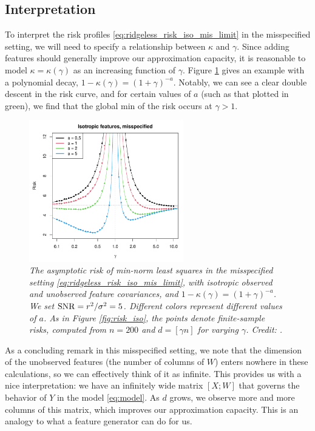 \documentclass{article}
\begin{document}
\subsection{Interpretation}

To interpret the risk profiles \eqref{eq:ridgeless_risk_iso_mis_limit} in the 
misspecified setting, we will need to specify a relationship between $\kappa$
and $\gamma$. Since adding features should generally improve our approximation
capacity, it is reasonable to model $\kappa=\kappa(\gamma)$ as an increasing 
function of $\gamma$. Figure \ref{fig:risk_iso_mis} gives an example with a
polynomial decay, $1-\kappa(\gamma) = (1+\gamma)^{-a}$. Notably, we can see a
clear double descent in the risk curve, and for certain values of $a$ (such as
that plotted in green), we find that the global min of the risk occurs at
$\gamma > 1$.  

\begin{figure}[htb]
\centering
\includegraphics[width=0.6\textwidth]{risk_iso_mis.pdf}
\caption{\it The asymptotic risk of min-norm least squares in the misspecified
  setting \eqref{eq:ridgeless_risk_iso_mis_limit}, with isotropic observed and 
  unobserved feature covariances, and $1-\kappa(\gamma) = (1+\gamma)^{-a}$. We
  set $\mathrm{SNR} = r^2 / \sigma^2 = 5$. Different colors represent different values
  of $a$. As in Figure \ref{fig:risk_iso}, the points denote finite-sample
  risks, computed from $n=200$ and $d=[\gamma n]$ for varying $\gamma$. 
  Credit: \citet{hastie2022surprises}.}    
\label{fig:risk_iso_mis}
\end{figure}

As a concluding remark in this misspecified setting, we note that the dimension
of the unobserved features (the number of columns of $W$) enters nowhere in
these calculations, so we can effectively think of it as infinite. This provides
us with a nice interpretation: we have an infinitely wide matrix $[X; W]$ that 
governs the behavior of $Y$ in the model \eqref{eq:model}. As $d$ grows, we
observe more and more columns of this matrix, which improves our approximation
capacity. This is an analogy to what a feature generator can do for us.       
\end{document}
